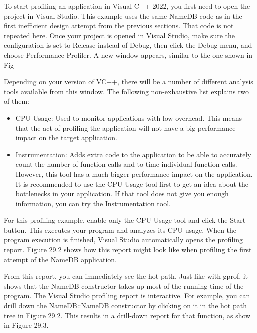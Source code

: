To start profiling an application in Visual C++ 2022, you first need to open the project in Visual Studio. This example uses the same NameDB code as in the first inefficient design attempt from the previous sections. That code is not repeated here. Once your project is opened in Visual Studio, make sure the configuration is set to Release instead of Debug, then click the Debug menu, and choose Performance Profiler. A new window appears, similar to the one shown in Fig


Depending on your version of VC++, there will be a number of different analysis tools available from this window. The following non-exhaustive list explains two of them:

\begin{itemize}
\item
CPU Usage: Used to monitor applications with low overhead. This means that the act of profiling the application will not have a big performance impact on the target application.

\item
Instrumentation: Adds extra code to the application to be able to accurately count the number of function calls and to time individual function calls. However, this tool has a much bigger performance impact on the application. It is recommended to use the CPU Usage tool first to get an idea about the bottlenecks in your application. If that tool does not give you enough information, you can try the Instrumentation tool.
\end{itemize}

For this profiling example, enable only the CPU Usage tool and click the Start button. This executes your program and analyzes its CPU usage. When the program execution is finished, Visual Studio automatically opens the profiling report. Figure 29.2 shows how this report might look like when profiling the first attempt of the NameDB application.

From this report, you can immediately see the hot path. Just like with gprof, it shows that the NameDB constructor takes up most of the running time of the program. The Visual Studio profiling report is interactive. For example, you can drill down the NameDB::NameDB constructor by clicking on it in the hot path tree in Figure 29.2. This results in a drill-down report for that function, as show in Figure 29.3.


